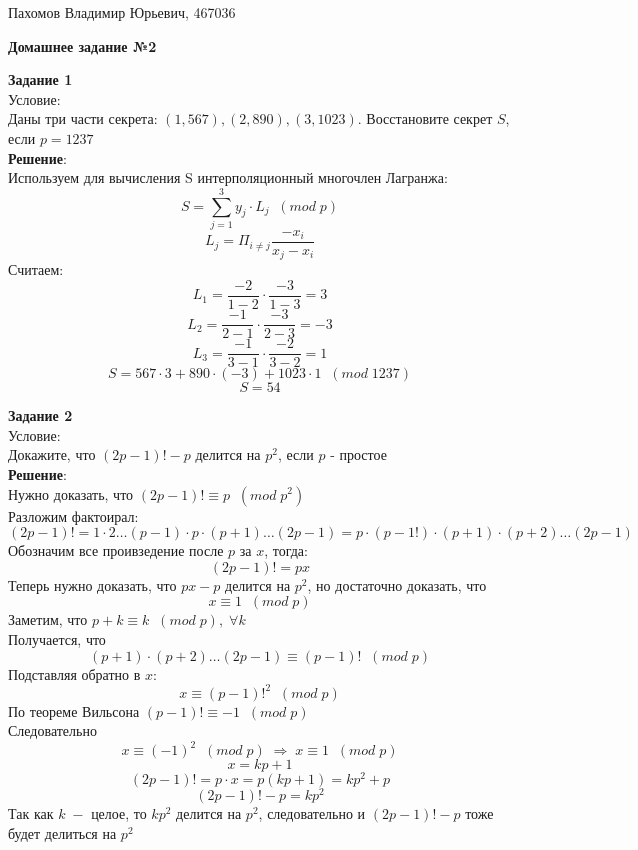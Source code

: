 \documentclass[12pt]{article}
\begin{document}
\begin{flushright}
    Пахомов Владимир Юрьевич, 467036
\end{flushright}

\begin{center}
    \textbf{Домашнее задание №2}
\end{center}

\begin{flushleft}
    \textbf{Задание 1} \\
    Условие: \\
    Даны три части секрета: $(1, 567), (2, 890), (3, 1023)$. Восстановите секрет $S$, если $p = 1237$ \\
    
    \vspace{20pt}
    \textbf{Решение}: \\
    Используем для вычисления S интерполяционный многочлен Лагранжа: \\
    \[ S = \sum_{j=1}^{3} y_j \cdot L_j \; \; (mod \; p) \]
    \[ L_j = \Pi_{i\ne j}\frac{-x_i}{x_j - x_i} \]
    Считаем: \\
    \[ L_1 = \frac{-2}{1 - 2} \cdot \frac{-3}{1 - 3} = 3 \]
    \[ L_2 = \frac{-1}{2 - 1} \cdot \frac{-3}{2 - 3} = -3 \]
    \[ L_3 = \frac{-1}{3 - 1} \cdot \frac{-2}{3 - 2} = 1 \]
    \[ S = 567 \cdot 3 + 890 \cdot (-3) + 1023 \cdot 1 \; \; (mod \; 1237) \]
    \[ S = 54 \]
\end{flushleft}


\newpage


\begin{flushleft}
    \textbf{Задание 2} \\
    Условие: \\
    Докажите, что $(2p-1)! - p$ делится на $p^2$, если $p$ - простое\\
    
    \vspace{20pt}
    \textbf{Решение}: \\
    Нужно доказать, что $(2p-1)! \equiv p \; \; (mod \; p^2) $ \\
    Разложим фактоирал:
    \[ (2p-1)! = 1 \cdot 2 \dots (p-1) \cdot p \cdot (p+1) \dots (2p-1) = p \cdot (p-1!) \cdot (p+1) \cdot (p+2) \dots (2p - 1) \]
    Обозначим все проивзедение после $p$ за $x$, тогда: \\
    \[(2p-1)! = px \]
    Теперь нужно доказать, что $px - p$ делится на $p^2$, но достаточно доказать, что
    \[ x \equiv 1 \; \; (mod \; p) \]
    Заметим, что $p + k \equiv k \; \; (mod \; p), \; \forall k$ \\
    Получается, что 
    \[(p+1) \cdot (p+2) \dots (2p - 1) \equiv (p-1)! \; \; (mod \; p) \]
    Подставляя обратно в $x$:
    \[ x \equiv (p-1)!^2 \; \; (mod \; p) \]
    По теореме Вильсона $(p-1)! \equiv -1 \; \; (mod \; p)$ \\
    Следовательно
    \[ x \equiv (-1)^2 \; \; (mod \; p) \; \Rightarrow \; x \equiv 1 \; \; (mod \; p) \]
    \[ x = kp + 1 \]
    \[(2p-1)! = p \cdot x = p(kp + 1) = kp^2 + p \]
    \[(2p-1)! - p = kp^2 \]
    Так как $k \; -$ целое, то $kp^2$ делится на $p^2$, следовательно и $(2p-1)!-p$ тоже будет делиться на $p^2$ 

\end{flushleft}
\end{document}
